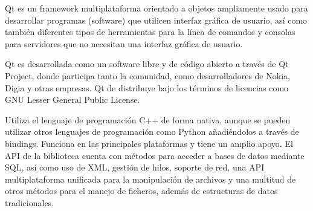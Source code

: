 Qt\cite{qt} es un framework multiplataforma orientado a objetos ampliamente usado para desarrollar programas (software) que utilicen interfaz gráfica de usuario, así como también diferentes tipos de herramientas para la línea de comandos y consolas para servidores que no necesitan una interfaz gráfica de usuario.

Qt es desarrollada como un software libre y de código abierto a través de Qt Project, donde participa tanto la comunidad, como desarrolladores de Nokia, Digia y otras empresas. Qt de distribuye bajo los términos de licencias como GNU Lesser General Public License. 

Utiliza el lenguaje de programación C++ de forma nativa, aunque se pueden utilizar otros lenguajes de programación como Python añadiéndolos a través de bindings. Funciona en las principales plataformas y tiene un amplio apoyo. El API de la biblioteca cuenta con métodos para acceder a bases de datos mediante SQL, así como uso de XML, gestión de hilos, soporte de red, una API multiplataforma unificada para la manipulación de archivos y una multitud de otros métodos para el manejo de ficheros, además de estructuras de datos tradicionales.












